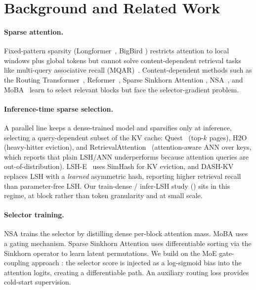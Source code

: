 \documentclass[10pt,letterpaper]{article}
\begin{document}
\section{Background and Related Work}\label{sec:related}

\paragraph{Sparse attention.}
Fixed-pattern sparsity (Longformer~\cite{beltagy2020longformer}, BigBird
\cite{zaheer2020bigbird}) restricts attention to local windows plus global
tokens but cannot solve content-dependent retrieval tasks like multi-query
associative recall (MQAR)~\cite{arora2024mqar,olsson2022induction}.
Content-dependent methods such as the Routing Transformer~\cite{roy2021routing},
Reformer~\cite{kitaev2020reformer}, Sparse Sinkhorn Attention
\cite{tay2020sinkhorn}, NSA~\cite{yuan2025nsa}, and MoBA~\cite{lu2025moba} learn
to select relevant blocks but face the selector-gradient problem.

\paragraph{Inference-time sparse selection.}
A parallel line keeps a dense-trained model and sparsifies only at inference,
selecting a query-dependent subset of the KV cache: Quest~\cite{tang2024quest}
(top-$k$ pages), H2O~\cite{zhang2023h2o} (heavy-hitter eviction), and
RetrievalAttention~\cite{liu2024retrievalattention} (attention-aware ANN over
keys, which reports that plain LSH/ANN underperforms because attention queries
are out-of-distribution). LSH-E~\cite{rabbani2024lshe} uses SimHash for KV
eviction, and DASH-KV~\cite{guo2026dashkv} replaces LSH with a \emph{learned}
asymmetric hash, reporting higher retrieval recall than parameter-free LSH. Our
train-dense / infer-LSH study () sits in this regime, at block
rather than token granularity and at small scale.

\paragraph{Selector training.}
NSA trains the selector by distilling dense per-block attention mass.
MoBA uses a gating mechanism. Sparse Sinkhorn Attention
\cite{tay2020sinkhorn} uses differentiable sorting via the Sinkhorn operator
to learn latent permutations. We build on the MoE gate-coupling approach
\cite{shazeer2017moe}: the selector score is injected as a log-sigmoid bias
into the attention logits, creating a differentiable path. An auxiliary
routing loss provides cold-start supervision.
\end{document}
